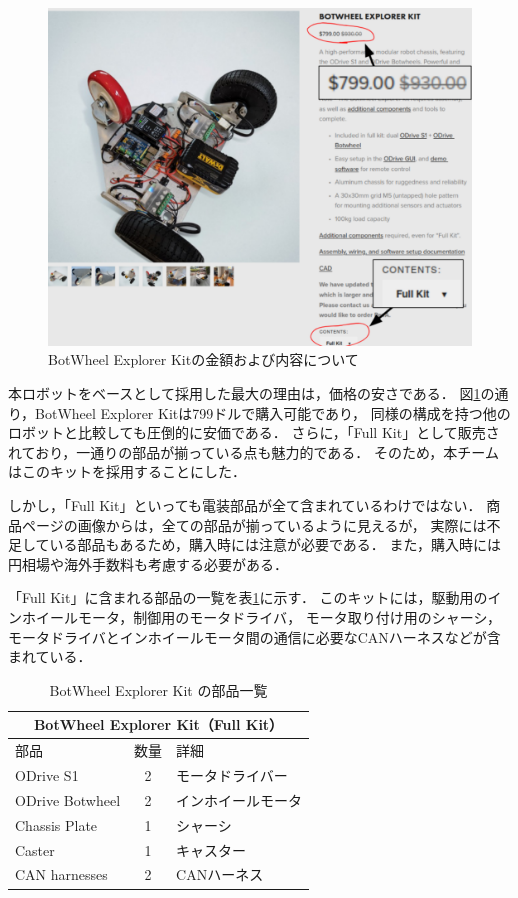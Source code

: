 \documentclass[twocolumn,9pt]{jsproceedings}
\begin{document}
\begin{figure}[h]
  \begin{center}
    \includegraphics[width=0.8\linewidth]{figs/b_kit_price.pdf}
    \caption{BotWheel Explorer Kitの金額および内容について}
    \label{fig:b_robot_price}
  \end{center}
\end{figure}

本ロボットをベースとして採用した最大の理由は，価格の安さである．
図\ref{fig:b_robot_price}の通り，BotWheel Explorer Kitは799ドルで購入可能であり，
同様の構成を持つ他のロボットと比較しても圧倒的に安価である．
さらに，「Full Kit」として販売されており，一通りの部品が揃っている点も魅力的である．
そのため，本チームはこのキットを採用することにした．

しかし，「Full Kit」といっても電装部品が全て含まれているわけではない．
商品ページの画像からは，全ての部品が揃っているように見えるが，
実際には不足している部品もあるため，購入時には注意が必要である．
また，購入時には円相場や海外手数料も考慮する必要がある．

「Full Kit」に含まれる部品の一覧を表\ref{tab:botwheel_kit}に示す．
このキットには，駆動用のインホイールモータ，制御用のモータドライバ，
モータ取り付け用のシャーシ，モータドライバとインホイールモータ間の通信に必要なCANハーネスなどが含まれている．
\begin{table}[h]
  \centering
  \caption{BotWheel Explorer Kit の部品一覧}
  \begin{tabular}{|l|c|l|}
      \hline
      \multicolumn{3}{|c|}{\textbf{BotWheel Explorer Kit（Full Kit）}} \\
      \hline
      部品 & 数量 & 詳細 \\
      \hline
      ODrive S1 & 2 & モータドライバー \\
      ODrive Botwheel & 2 & インホイールモータ \\
      Chassis Plate & 1 & シャーシ \\
      Caster & 1 & キャスター \\
      CAN harnesses & 2 & CANハーネス \\
      \hline
  \end{tabular}
  \label{tab:botwheel_kit}
\end{table}
\end{document}
